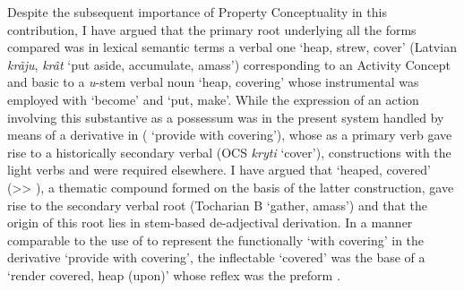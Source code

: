 \documentclass[output=paper,colorlinks,citecolor=brown]{langscibook}
\begin{document}
Despite the subsequent importance of Property Conceptuality in this contribution, I have argued that the primary root underlying all the forms compared was in lexical semantic terms a verbal one  ‘heap, strew, cover’ (Latvian \textit{krãju}, \textit{krât} ‘put aside, accumulate, amass’) corresponding to an Activity Concept and basic to a \textit{u}-stem verbal noun  ‘heap, covering’ whose instrumental was employed with   ‘become’ and   ‘put, make’. While the expression of an action involving this substantive as a possessum was in the present system handled by means of a derivative in   ( ‘provide with covering’), whose  as a primary verb gave rise to a historically secondary verbal   (OCS \textit{kryti} ‘cover’), constructions with the light verbs  and  were required elsewhere. I have argued that  ‘heaped, covered’ ({>}{>} ), a thematic compound formed on the basis of the latter construction, gave rise to the secondary verbal root  (Tocharian B  ‘gather, amass’) and that the origin of this root lies in stem-based de-adjectival derivation. In a manner comparable to the use of   to represent the functionally   ‘with covering’ in the derivative  ‘provide with covering’, the inflectable   ‘covered’ was the base of a  ‘render covered, heap (upon)’ whose reflex  was the preform . 
\end{document}
